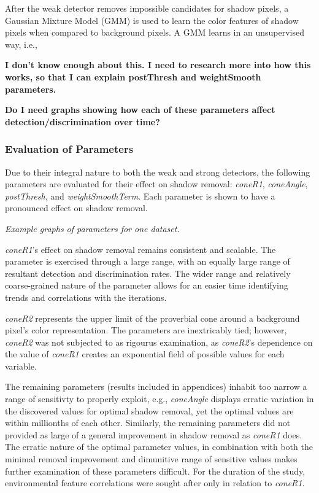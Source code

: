 \documentclass[12pt]{report}
\begin{document}
After the weak detector removes impossible candidates for shadow pixels, a Gaussian Mixture Model (GMM) is used to learn the color features of shadow pixels when compared to background pixels. A GMM learns in an unsupervised way, i.e., 

\textbf{I don't know enough about this. I need to research more into how this works, so that I can explain postThresh and weightSmooth parameters.}

\textbf{Do I need graphs showing how each of these parameters affect detection/discrimination over time?}

\subsubsection{Evaluation of Parameters}

Due to their integral nature to both the weak and strong detectors, the following parameters are evaluated for their effect on shadow removal: \textit{coneR1}, \textit{coneAngle}, \textit{postThresh}, and \textit{weightSmoothTerm}. Each parameter is shown to have a pronounced effect on shadow removal.

\textit{Example graphs of parameters for one dataset.}

\textit{coneR1}'s effect on shadow removal remains consistent and scalable. The parameter is exercised through a large range, with an equally large range of resultant detection and discrimination rates. The wider range and relatively coarse-grained nature of the parameter allows for an easier time identifying trends and correlations with the iterations. 

\textit{coneR2} represents the upper limit of the proverbial cone around a background pixel's color representation. The parameters are inextricably tied; however, \textit{coneR2} was not subjected to as rigourus examination, as \textit{coneR2}'s dependence on the value of \textit{coneR1} creates an exponential field of possible values for each variable. 

The remaining parameters (results included in appendices) inhabit too narrow a range of sensitivty to properly exploit, e.g., \textit{coneAngle} displays erratic variation in the discovered values for optimal shadow removal, yet the optimal values are within millionths of each other. Similarly, the remaining parameters did not provided as large of a general improvement in shadow removal as \textit{coneR1} does. The erratic nature of the optimal parameter values, in combination with both the minimal removal improvement and dimunitive range of sensitive values makes further examination of these parameters difficult. For the duration of the study, environmental feature correlations were sought after only in relation to \textit{coneR1}.
\end{document}
